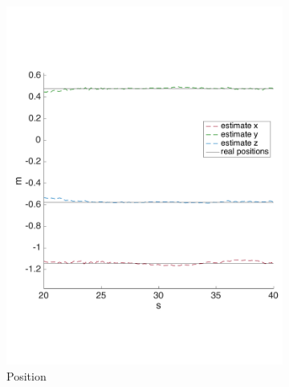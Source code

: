\begin{figure}[!htbp]
  \centering
   \begin{subfigure}[b]{0.45\textwidth}
        \includegraphics[width=\textwidth]{img/tag_static_real_world_pos.pdf}
        \caption{Position }
        \label{fig:one_ekf_real_world_static}
   \end{subfigure}\hfill
   \begin{subfigure}[b]{0.45\textwidth}

\end{subfigure}
\end{figure}
